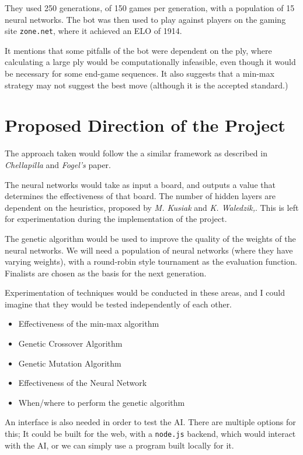 \documentclass[]{article}
\providecommand{\tightlist}{%
  \setlength{\itemsep}{0pt}\setlength{\parskip}{0pt}}
\begin{document}
They used 250 generations, of 150 games per generation, with a
population of 15 neural networks. The bot was then used to play against
players on the gaming site \texttt{zone.net}, where it achieved an ELO
of 1914.

It mentions that some pitfalls of the bot were dependent on the ply,
where calculating a large ply would be computationally infeasible, even
though it would be necessary for some end-game sequences. It also
suggests that a min-max strategy may not suggest the best move (although
it is the accepted standard.)

\pagebreak

\section{Proposed Direction of the
Project}\label{proposed-direction-of-the-project}

The approach taken would follow the a similar framework as described in
\emph{Chellapilla} and \emph{Fogel's} paper.

The neural networks would take as input a board, and outputs a value
that determines the effectiveness of that board. The number of hidden
layers are dependent on the heuristics, proposed by \emph{M. Kusiak} and
\emph{K. Waledzik,}. This is left for experimentation during the
implementation of the project.

The genetic algorithm would be used to improve the quality of the
weights of the neural networks. We will need a population of neural
networks (where they have varying weights), with a round-robin style
tournament as the evaluation function. Finalists are chosen as the basis
for the next generation.

Experimentation of techniques would be conducted in these areas, and I
could imagine that they would be tested independently of each other.

\begin{itemize}
\tightlist
\item
  Effectiveness of the min-max algorithm
\item
  Genetic Crossover Algorithm
\item
  Genetic Mutation Algorithm
\item
  Effectiveness of the Neural Network
\item
  When/where to perform the genetic algorithm
\end{itemize}

An interface is also needed in order to test the AI. There are multiple
options for this; It could be built for the web, with a \texttt{node.js}
backend, which would interact with the AI, or we can simply use a
program built locally for it.
\end{document}
